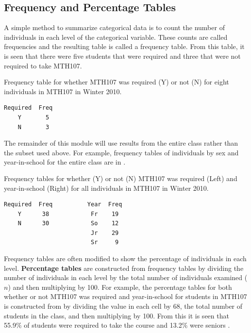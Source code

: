 \documentclass[10pt,openany]{book}\usepackage[]{graphicx}\usepackage[]{color}
\begin{document}
\subsection{Frequency and Percentage Tables}
A simple method to summarize categorical data is to count the number of individuals in each level of the categorical variable. These counts are called frequencies and the resulting table  is called a frequency table. From this table, it is seen that there were five students that were required and three that were not required to take MTH107.

\begin{table}[htbp]
  \caption{Frequency table for whether MTH107 was required (Y) or not (N) for eight individuals in MTH107 in Winter 2010.}
  \label{tab:MTH107SubsetFreq}
  \centering
  \begin{Verbatim}[xleftmargin=15mm]
Required  Freq
    Y       5
    N       3
  \end{Verbatim}
\end{table}

The remainder of this module will use results from the entire class rather than the subset used above. For example, frequency tables of individuals by sex and year-in-school for the entire class are in .

\begin{table}[htbp]
  \caption{Frequency tables for whether (Y) or not (N) MTH107 was required (Left) and year-in-school (Right) for all individuals in MTH107 in Winter 2010.}
  \label{tab:Mth107Freq}
  \centering
  \begin{Verbatim}[xleftmargin=15mm]
Required  Freq          Year  Freq
    Y      38            Fr    19
    N      30            So    12
                         Jr    29
                         Sr     9
   \end{Verbatim}
\end{table}

Frequency tables are often modified to show the percentage of individuals in each level. \textbf{Percentage tables} are constructed from frequency tables by dividing the number of individuals in each level by the total number of individuals examined ($n$) and then multiplying by 100. For example, the percentage tables for both whether or not MTH107 was required and year-in-school  for students in MTH107 is constructed from  by dividing the value in each cell by 68, the total number of students in the class, and then multiplying by 100. From this it is seen that 55.9\% of students were required to take the course and 13.2\% were seniors .
\end{document}
